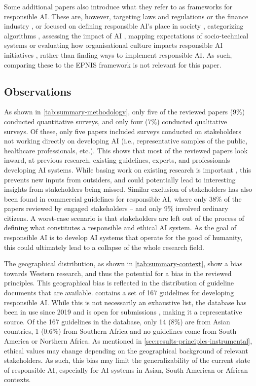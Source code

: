 Some additional papers also introduce what they refer to as frameworks for responsible AI. These are, however, targeting laws and regulations \parencite{Brand_2022} or the finance industry \parencite{Rizinski_2022}, or focused on defining responsible AI's place in society \parencite{Buhmann_2021}, categorizing algorithms \parencite{Cheng_2021}, assessing the impact of AI \parencite{Havrda_2020}, mapping expectations of socio-technical systems \parencite{Minkkinen_2021} or evaluating how organisational culture impacts responsible AI initiatives \parencite{Rakova_2021}, rather than finding ways to implement responsible AI. As such, comparing these to the EPNIS framework is not relevant for this paper.


\subsection{Observations}
As shown in \autoref{tab:summary-methodology}, only five of the reviewed papers (9\%) conducted quantitative surveys, and only four (7\%) conducted qualitative surveys. Of these, only five papers included surveys conducted on stakeholders not working directly on developing AI (i.e., representative samples of the public, healthcare professionals, etc.). This shows that most of the reviewed papers look inward, at previous research, existing guidelines, experts, and professionals developing AI systems. While basing work on existing research is important \parencite{Tranfield_2003}, this prevents new inputs from outsiders, and could potentially lead to interesting insights from stakeholders being missed. Similar exclusion of stakeholders has also been found in commercial guidelines for responsible AI, where only 38\% of the papers reviewed by \textcite{Bélisle-Pipon_2022} engaged stakeholders -- and only 9\% involved ordinary citizens. A worst-case scenario is that stakeholders are left out of the process of defining what constitutes a responsible and ethical AI system. As the goal of responsible AI is to develop AI systems that operate for the good of humanity, this could ultimately lead to a collapse of the whole research field.


The geographical distribution, as shown in \autoref{tab:summary-context}, show a bias towards Western research, and thus the potential for a bias in the reviewed principles. This geographical bias is reflected in the distribution of guideline documents that are available. \textcite{AlgorithmWatch} contains a set of 167 guidelines for developing responsible AI. While this is not necessarily an exhaustive list, the database has been in use since 2019 and is open for submissions \parencite{AlgorithmWatch_about}, making it a representative source. Of the 167 guidelines in the database, only 14 (8\%) are from Asian countries, 1 (0.6\%) from Southern Africa and no guidelines come from South America or Northern Africa. As mentioned in \autoref{sec:results-principles-instrumental}, ethical values may change depending on the geographical background of relevant stakeholders. As such, this bias may limit the generalizability of the current state of responsible AI, especially for AI systems in Asian, South American or African contexts.


